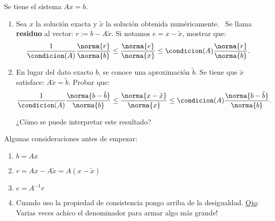 \begin{enunciado}{\ejercicio}
  Se tiene el sistema $Ax = b$.

  \begin{enumerate}[label=(\alph*)]
    \item Sea  $x$ la solución exacta y \( \tilde{x} \) la solución obtenida numéricamente. \
          Se llama \textbf{residuo} al vector: $r := b - A\tilde{x}$.
          Si notamos $e = x - \tilde{x}$, mostrar que:
          $$
            \frac{1}{\condicion(A)}  \frac{\norma{r}}{\norma{b}} \leq \frac{\norma{e}}{\norma{x}} \leq  \condicion(A) \frac{\norma{r}}{\norma{b}}.
          $$

    \item En lugar del dato exacto \( b \), se conoce una aproximación \( \tilde{b} \).
          Se tiene que \( \tilde{x} \) satisface: $A\tilde{x} = \tilde{b}.$
          Probar que:
          $$
            \frac{1}{\condicion(A)}  \frac{\norma{b - \tilde{b}}}{\norma{b}}
            \leq
            \frac{\norma{x - \tilde{x}}}{\norma{x}}
            \leq
            \condicion(A)  \frac{\norma{b - \tilde{b}}}{\norma{b}}.
          $$

          ¿Cómo se puede interpretar este resultado?
  \end{enumerate}
\end{enunciado}

\medskip

Algunas consideraciones antes de empezar:
\begin{enumerate}[label=(\roman*)]
  \item $b = Ax$
  \item $r = Ax - A\tilde{x} = A(x - \tilde{x})$
  \item $e = A^{-1} r$
  \item Cuando uso la propiedad de consistencia pongo  arriba de la desigualdad.
        \underline{Ojo}: Varias veces achico el denominador para armar algo más grande!
\end{enumerate}

